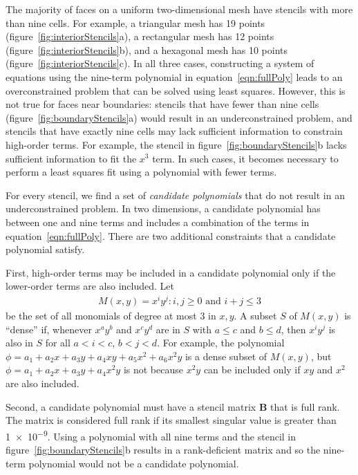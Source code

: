 The majority of faces on a uniform two-dimensional mesh have stencils with more than nine cells.  For example, a triangular mesh has 19 points (figure~\ref{fig:interiorStencils}a), a rectangular mesh has 12 points (figure~\ref{fig:interiorStencils}b), and a hexagonal mesh has 10 points (figure~\ref{fig:interiorStencils}c).
In all three cases, constructing a system of equations using the nine-term polynomial in equation~\eqref{eqn:fullPoly} leads to an overconstrained problem that can be solved using least squares.  However, this is not true for faces near boundaries: stencils that have fewer than nine cells (figure~\ref{fig:boundaryStencils}a) would result in an underconstrained problem, and stencils that have exactly nine cells may lack sufficient information to constrain high-order terms.  For example, the stencil in figure~\ref{fig:boundaryStencils}b lacks sufficient information to fit the $x^3$ term.  In such cases, it becomes necessary to perform a least squares fit using a polynomial with fewer terms.

For every stencil, we find a set of \textit{candidate polynomials} that do not result in an underconstrained problem.  In two dimensions, a candidate polynomial has between one and nine terms and includes a combination of the terms in equation~\eqref{eqn:fullPoly}.  There are two additional constraints that a candidate polynomial satisfy.

First, high-order terms may be included in a candidate polynomial only if the lower-order terms are also included.
Let
\begin{align}
	M(x, y) = { x^i y^j : i,j \geq 0 \text{ and } i+j \leq 3 }
\end{align}
be the set of all monomials of degree at most \num{3} in $x, y$.
A subset $S$ of $M(x,y)$ is ``dense'' if, whenever $x^a y^b$ and $x^c y^d$ are in $S$ with $a \leq c$ and $b \leq d$, then $x^i y^j$ is also in $S$ for all $a < i < c$, $b < j < d$.
For example, the polynomial $\phi = a_1 + a_2 x + a_3 y + a_4 xy + a_5 x^2 + a_6 x^2 y$ is a dense subset of $M(x,y)$, but $\phi = a_1 + a_2 x + a_3 y + a_4 x^2 y$ is not because $x^2 y$ can be included only if $xy$ and $x^2$ are also included.

Second, a candidate polynomial must have a stencil matrix $\mathbf{B}$ that is full rank.  The matrix is considered full rank if its smallest singular value is greater than \num{1e-9}.  Using a polynomial with all nine terms and the stencil in figure~\ref{fig:boundaryStencils}b results in a rank-deficient matrix and so the nine-term polynomial would not be a candidate polynomial.

